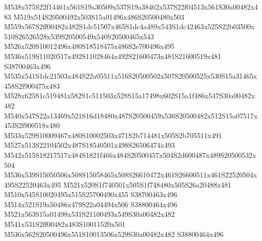 \documentclass{article}
\begin{document}
\begin{multicols}{2}
M538x575S22f14461x561S19a30509x537S19a38462x537S22f04513x561S30a00482x483 M519x514S20500492x503S15a01496x486S20500480x503 M559x567S2ff00482x482S1dc51507x465S1dc4a489x543S1dc42463x525S22b03500x510S26526528x539S20500549x540S20500465x543 M526x520S10012496x480S18518475x486S2e700496x495 M536x519S11020517x492S11028464x492S21600473x481S21600519x481 S38700463x496 M535x541S1dc21503x484S22a05511x516S20500502x507S20500525x530S15a31465x458S2f900475x483 M528x625S1c519481x582S1c511503x528S15a17498x602S15a1f486x547S30a00482x482 M540x547S22a13469x521S16d18480x487S20500459x536S20500482x512S15a07517x453S2f900518x480 M533x529S10009467x480S10002503x471S2b714481x505S2b705511x491 M527x513S22104502x487S18540501x498S26506474x493 M542x515S18217517x484S1821f466x484S20500457x504S2d600487x489S20500532x504 M536x539S15050506x508S15058465x508S26610472x461S26600511x461S22520504x495S22520463x495 M521x520S1f740501x505S1f748480x505S26a20488x481 M510x545S10020495x515S25700490x455 S38700463x496 M514x521S19a50486x479S22a04494x506 S38800464x496 M521x563S15a01498x531S21100493x549S30a00482x482 M541x531S2ff00482x483S10011520x501 M536x562S20500496x551S10013506x529S30a00482x482 S38800464x496










\end{multicols}
\end{document}
